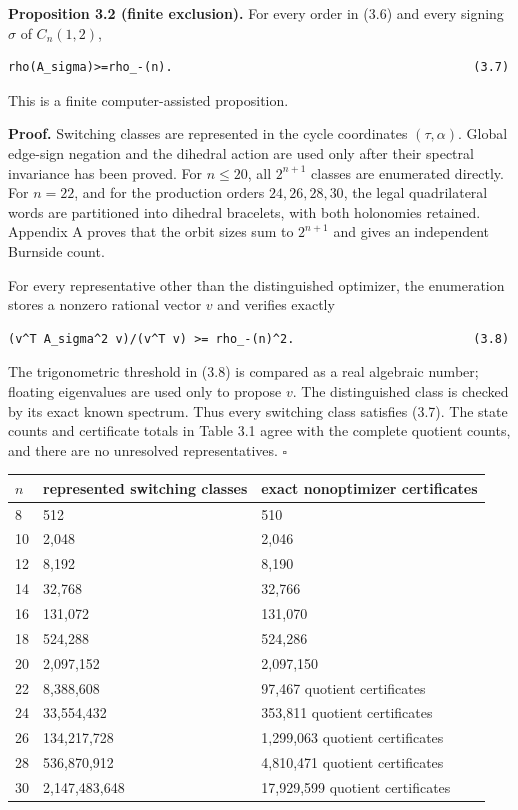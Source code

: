 \textbf{Proposition 3.2 (finite exclusion).} For every order in (3.6) and every
signing \(\sigma\) of \(C_n(1,2)\),

\begin{lstlisting}[language={}]
rho(A_sigma)>=rho_-(n).                                          (3.7)
\end{lstlisting}

This is a finite computer-assisted proposition.

\textbf{Proof.} Switching classes are represented in the cycle coordinates
\((\tau,\alpha)\). Global edge-sign negation and the dihedral action are used only after
their spectral invariance has been proved. For \(n\le 20\), all \(2^{n+1}\) classes
are enumerated directly. For \(n=22\), and for the production orders
\(24,26,28,30\), the legal quadrilateral words are partitioned into dihedral
bracelets, with both holonomies retained. Appendix A proves that the orbit
sizes sum to \(2^{n+1}\) and gives an independent Burnside count.

For every representative other than the distinguished optimizer, the
enumeration stores a nonzero rational vector \(v\) and verifies exactly

\begin{lstlisting}[language={}]
(v^T A_sigma^2 v)/(v^T v) >= rho_-(n)^2.                         (3.8)
\end{lstlisting}

The trigonometric threshold in (3.8) is compared as a real algebraic number;
floating eigenvalues are used only to propose \(v\). The distinguished class is
checked by its exact known spectrum. Thus every switching class satisfies
(3.7). The state counts and certificate totals in Table 3.1 agree with the
complete quotient counts, and there are no unresolved representatives. \(\square\)

\begin{center}
\begin{tabular}{lll}
\toprule
\(n\) & represented switching classes & exact nonoptimizer certificates \\
\midrule
8 & 512 & 510 \\
10 & 2,048 & 2,046 \\
12 & 8,192 & 8,190 \\
14 & 32,768 & 32,766 \\
16 & 131,072 & 131,070 \\
18 & 524,288 & 524,286 \\
20 & 2,097,152 & 2,097,150 \\
22 & 8,388,608 & 97,467 quotient certificates \\
24 & 33,554,432 & 353,811 quotient certificates \\
26 & 134,217,728 & 1,299,063 quotient certificates \\
28 & 536,870,912 & 4,810,471 quotient certificates \\
30 & 2,147,483,648 & 17,929,599 quotient certificates \\
\bottomrule
\end{tabular}%
\end{center}

